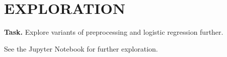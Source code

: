 \documentclass{support/acm_proc_article-sp}
\begin{document}

    \section{EXPLORATION}
    \vspace{\baselineskip}

    \textbf{Task.} Explore variants of preprocessing and logistic regression further.

    See the Jupyter Notebook for further exploration.


    
    
\end{document}
